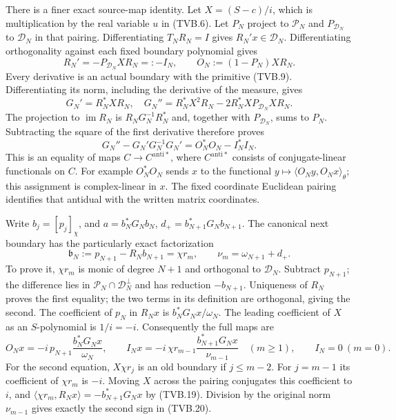\documentclass[11pt]{article}
\newcommand{\im}{\operatorname{im}}
\begin{document}
There is a finer exact source-map identity. Let $X=(S-c)/i$,
which is multiplication by the real variable $u$ in (TVB.6).
Let $P_N$ project to $\mathcal P_N$ and $P_{\mathcal D_N}$ to
$\mathcal D_N$ in that pairing. Differentiating $T_NR_N=I$
gives $R_N'x\in\mathcal D_N$. Differentiating orthogonality
against each fixed boundary polynomial gives
\[
 R_N'=-P_{\mathcal D_N}XR_N=:-I_N,
 \qquad O_N:=(1-P_N)XR_N.
 \tag{TVB.17}
\]
Every derivative is an actual boundary with the primitive
(TVB.9). Differentiating its norm, including the derivative of
the measure, gives
\[
 G_N'=R_N^*XR_N,\quad
 G_N''=R_N^*X^2R_N-2R_N^*XP_{\mathcal D_N}XR_N.
\]
The projection to $\im R_N$ is $R_NG_N^{-1}R_N^*$ and,
together with $P_{\mathcal D_N}$, sums to $P_N$.
Subtracting the square of the first derivative therefore proves
\[
 G_N''-G_N'G_N^{-1}G_N'=O_N^*O_N-I_N^*I_N.
 \tag{TVB.18}
\]
This is an equality of maps $C\to C^{\mathrm{anti}*}$, where
$C^{\mathrm{anti}*}$ consists of conjugate-linear functionals on $C$.
For example $O_N^*O_N$ sends $x$ to the functional
$y\mapsto\langle O_Ny,O_Nx\rangle_\theta$; this assignment is
complex-linear in $x$. The fixed coordinate Euclidean pairing
identifies that antidual with the written matrix coordinates.

Write $b_j=[p_j]_\chi$, and
$a=b_N^*G_Nb_N$, $d_+=b_{N+1}^*G_Nb_{N+1}$.
The canonical next boundary has the particularly exact factorization
\[
 \mathfrak b_N:=p_{N+1}-R_Nb_{N+1}=\chi r_m,
 \qquad \nu_m=\omega_{N+1}+d_+.
 \tag{TVB.19}
\]
To prove it, $\chi r_m$ is monic of degree $N+1$ and orthogonal
to $\mathcal D_N$. Subtract $p_{N+1}$; the difference lies in
$\mathcal P_N\cap\mathcal D_N^\perp$ and has reduction
$-b_{N+1}$. Uniqueness of $R_N$ proves the first equality;
the two terms in its definition are orthogonal, giving the second.
The coefficient of $p_N$ in $R_Nx$ is $b_N^*G_Nx/\omega_N$.
The leading coefficient of $X$ as an $S$-polynomial is $1/i=-i$.
Consequently the full maps are
\[
 O_Nx=-i\,p_{N+1}\frac{b_N^*G_Nx}{\omega_N},\qquad
 I_Nx=-i\,\chi r_{m-1}\frac{b_{N+1}^*G_Nx}{\nu_{m-1}}
 \quad(m\ge1),\qquad I_N=0\ (m=0).
 \tag{TVB.20}
\]
For the second equation, $X\chi r_j$ is an old boundary if
$j\le m-2$. For $j=m-1$ its coefficient of $\chi r_m$ is
$-i$. Moving $X$ across the pairing conjugates this coefficient
to $i$, and $\langle\chi r_m,R_Nx\rangle
=-b_{N+1}^*G_Nx$ by (TVB.19). Division by the original norm
$\nu_{m-1}$ gives exactly the second sign in (TVB.20).
\end{document}
